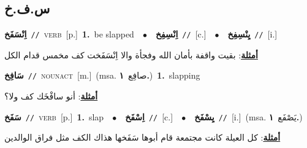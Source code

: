 \documentclass[10pt,a4paper,twoside]{article} %
\begin{document}
\begin{multicols}{2}
\vspace{-3mm}
\subsection*{\color{blue}\foreignlanguage{arabic}{س.ف.خ}\color{blue}{}} 

{\setlength\topsep{0pt}\textbf{\foreignlanguage{arabic}{اِنْسَفَخ}}\ {\color{gray}\texttt{//}\color{black}}\ \textsc{verb}\ [p.]\ \textbf{1.}~be slapped\ \ $\bullet$\ \ \setlength\topsep{0pt}\textbf{\foreignlanguage{arabic}{اِنْسِفِخ}}\ {\color{gray}\texttt{//}\color{black}}\ [c.]\ \ $\bullet$\ \ \setlength\topsep{0pt}\textbf{\foreignlanguage{arabic}{يِنْسِفِخ}}\ {\color{gray}\texttt{//}\color{black}}\ [i.]\  \begin{flushright}\color{gray}\foreignlanguage{arabic}{\textbf{\underline{\foreignlanguage{arabic}{أمثلة}}}: بقيت واقفة بأمان الله وفجأة والا اِنْسَفَخت كف مخمس قدام الكل}\end{flushright}\color{black}} \vspace{2mm}

{\setlength\topsep{0pt}\textbf{\foreignlanguage{arabic}{سَافِخ}}\ {\color{gray}\texttt{//}\color{black}}\ \textsc{noun\textunderscore act}\ [m.]\ \color{gray}(msa. \foreignlanguage{arabic}{صافِع}~\foreignlanguage{arabic}{\textbf{١.}})\color{black}\ \textbf{1.}~slapping\  \begin{flushright}\color{gray}\foreignlanguage{arabic}{\textbf{\underline{\foreignlanguage{arabic}{أمثلة}}}: أنو سافْخَك كف ولا؟}\end{flushright}\color{black}} \vspace{2mm}

{\setlength\topsep{0pt}\textbf{\foreignlanguage{arabic}{سَفَخ}}\ {\color{gray}\texttt{//}\color{black}}\ \textsc{verb}\ [p.]\ \textbf{1.}~slap\ \ $\bullet$\ \ \setlength\topsep{0pt}\textbf{\foreignlanguage{arabic}{اِسْفَخ}}\ {\color{gray}\texttt{//}\color{black}}\ [c.]\ \ $\bullet$\ \ \setlength\topsep{0pt}\textbf{\foreignlanguage{arabic}{يِسْفَخ}}\ {\color{gray}\texttt{//}\color{black}}\ [i.]\ \color{gray}(msa. \foreignlanguage{arabic}{يَصْفَع}~\foreignlanguage{arabic}{\textbf{١.}})\color{black}\  \begin{flushright}\color{gray}\foreignlanguage{arabic}{\textbf{\underline{\foreignlanguage{arabic}{أمثلة}}}: كل العيلة كانت مجتمعة قام أبوها سَفَخها هذاك الكف مثل فراق الوالدين}\end{flushright}\color{black}} \vspace{2mm}


\end{multicols}
\end{document}
